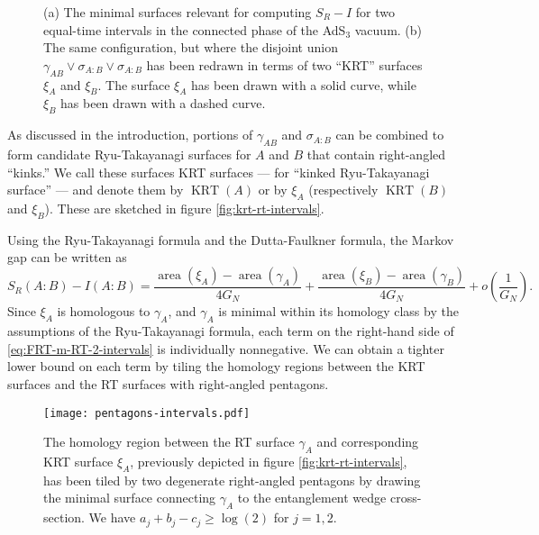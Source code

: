 \documentclass[a4paper,11pt]{article}
\newcommand{\area}{\operatorname{area}}
\newcommand{\KRT}{\operatorname{KRT}}
\begin{document}
\begin{figure}
    \centering
    \caption{(a) The minimal surfaces relevant for computing $S_R - I$ for two equal-time intervals in the connected phase of the AdS$_3$ vacuum.  (b) The same configuration, but where the disjoint union $\gamma_{AB} \vee \sigma_{A:B} \vee \sigma_{A:B}$ has been redrawn in terms of two ``KRT'' surfaces $\xi_A$ and $\xi_B$. The surface $\xi_A$ has been drawn with a solid curve, while $\xi_B$ has been drawn with a dashed curve.}
\end{figure}

As discussed in the introduction, portions of $\gamma_{AB}$ and $\sigma_{A:B}$ can be combined to form candidate Ryu-Takayanagi surfaces for $A$ and $B$ that contain right-angled ``kinks.'' We call these surfaces KRT surfaces --- for ``kinked Ryu-Takayanagi surface'' --- and denote them by $\KRT(A)$ or by $\xi_{A}$ (respectively $\KRT(B)$ and $\xi_{B}$). These are sketched in figure \ref{fig:krt-rt-intervals}.

Using the Ryu-Takayanagi formula and the Dutta-Faulkner formula, the Markov gap can be written as
\begin{equation} \label{eq:FRT-m-RT-2-intervals}
    S_R(A:B) - I(A:B) = \frac{\area(\xi_{A}) - \area(\gamma_{A})}{4 G_N} + \frac{\area(\xi_{B}) - \area(\gamma_{B})}{4 G_N} + o\left(\frac{1}{G_N}\right).
\end{equation}
Since $\xi_A$ is homologous to $\gamma_A$, and $\gamma_A$ is minimal within its homology class by the assumptions of the Ryu-Takayanagi formula, each term on the right-hand side of \eqref{eq:FRT-m-RT-2-intervals} is individually nonnegative. We can obtain a tighter lower bound on each term by tiling the homology regions between the KRT surfaces and the RT surfaces with right-angled pentagons.

\begin{figure}
    \centering
    \texttt{[image: pentagons-intervals.pdf]}
    \caption{The homology region between the RT surface $\gamma_A$ and corresponding KRT surface $\xi_A$, previously depicted in figure \ref{fig:krt-rt-intervals}, has been tiled by two degenerate right-angled pentagons by drawing the minimal surface connecting $\gamma_A$ to the entanglement wedge cross-section. We have $a_j + b_j - c_j \geq \log(2)$ for $j=1,2.$}
    \label{fig:pentagons-intervals}
\end{figure}
\end{document}
